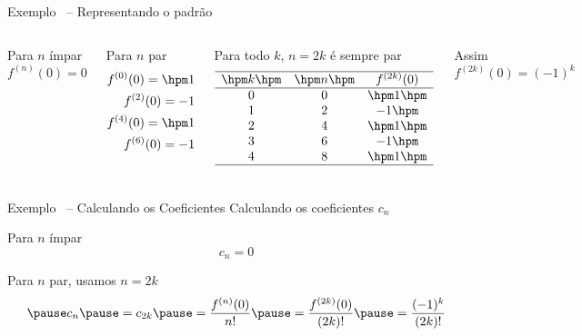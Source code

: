 \documentclass[fleqn,utf8,aspectratio=169,12pt]{beamer}
\begin{document}
\begin{frame}{Exemplo \theexemplo\ -- Representando o padrão}
\begin{columns}
  Para $n$ ímpar
  \[
    f^{(n)}(0) = 0
  \]

  \pause
  Para $n$ par
  \begin{align*}
    f^{(0)}(0) = \hpm 1  \\
    f^{(2)}(0) =     -1  \\
    f^{(4)}(0) = \hpm 1  \\
    f^{(6)}(0) =     -1
  \end{align*}

  \pause
  Para todo $k$, \(n=2k\) é sempre par
  \[
    \begin{array}{ccc}
      \hline
      \hpm k \hpm & \hpm n \hpm & f^{(2k)}(0) \\ \hline
      0           & 0           & \hpm 1 \hpm \\
      1           & 2           &     -1 \hpm \\
      2           & 4           & \hpm 1 \hpm \\
      3           & 6           &     -1 \hpm \\
      4           & 8           & \hpm 1 \hpm \\ \hline
    \end{array}
  \]

  \pause
  Assim
  \(
    f^{(2k)}(0) = (-1)^k
  \)
\end{columns}
\end{frame}

\begin{frame}{Exemplo \theexemplo\ -- Calculando os Coeficientes}
  Calculando os coeficientes $c_n$

  \pause
  Para $n$ ímpar
  \[
    c_n = 0
  \]

  \pause
  Para $n$ par, usamos $n=2k$
  \[
    \pause
    c_n
    \pause
    = c_{2k}
    \pause
    = \frac{f^{(n)}(0)}{n!}
    \pause
    = \frac{f^{(2k)}(0)}{(2k)!}
    \pause
    = \frac{(-1)^k}{(2k)!}
  \]
\end{frame}
\end{document}
